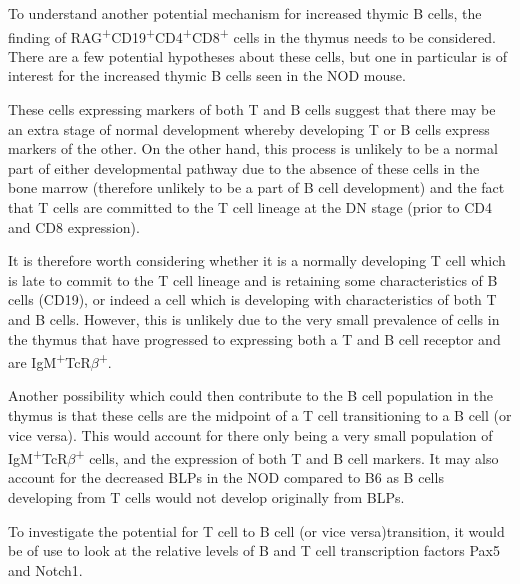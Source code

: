 To understand another potential mechanism for increased thymic B cells, the finding of RAG\textsuperscript{+}CD19\textsuperscript{+}CD4\textsuperscript{+}CD8\textsuperscript{+} cells in the thymus needs to be considered.
There are a few potential hypotheses about these cells, but one in particular is of interest for the increased thymic B cells seen in the NOD mouse.

These cells expressing markers of both T and B cells suggest that there may be an extra stage of normal development whereby developing T or B cells express markers of the other.
On the other hand, this process is unlikely to be a normal part of either developmental pathway due to the absence of these cells in the bone marrow (therefore unlikely to be a part of B cell development) and the fact that T cells are committed to the T cell lineage at the DN stage (prior to CD4 and CD8 expression).

It is therefore worth considering whether it is a normally developing T cell which is late to commit to the T cell lineage and is retaining some characteristics of B cells (CD19), or indeed a cell which is developing with characteristics of both T and B cells.
However, this is unlikely due to the very small prevalence of cells in the thymus that have progressed to expressing both a T and B cell receptor and are IgM\textsuperscript{+}TcR$\beta$\textsuperscript{+}.

Another possibility which could then contribute to the B cell population in the thymus is that these cells are the midpoint of a T cell transitioning to a B cell (or vice versa).
This would account for there only being a very small population of IgM\textsuperscript{+}TcR$\beta$\textsuperscript{+} cells, and the expression of both T and B cell markers.
It may also account for the decreased BLPs in the NOD compared to B6 as B cells developing from T cells would not develop originally from BLPs.


To investigate the potential for T cell to B cell (or vice versa)transition, it would be of use to look at the relative levels of B and T cell transcription factors Pax5 and Notch1.

